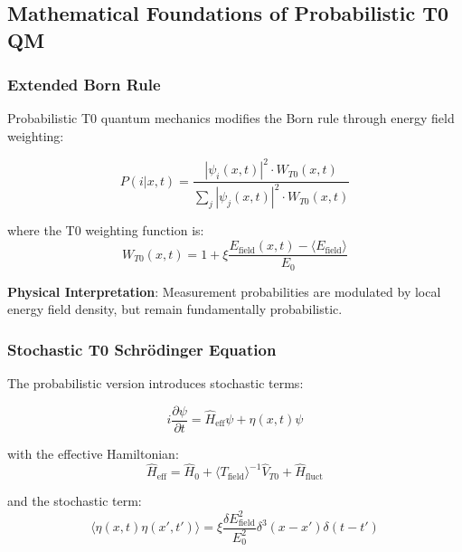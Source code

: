 \documentclass[12pt,a4paper]{article}
\newcommand{\xipar}{\xi}
\theoremstyle{definition}
\theoremstyle{remark}
\begin{document}
\subsection{Mathematical Foundations of Probabilistic T0 QM}

\subsubsection{Extended Born Rule}

Probabilistic T0 quantum mechanics modifies the Born rule through energy field weighting:

\begin{equation}
	\boxed{P(i|x,t) = \frac{|\psi_i(x,t)|^2 \cdot W_{T0}(x,t)}{\sum_j |\psi_j(x,t)|^2 \cdot W_{T0}(x,t)}}
	\label{eq:modified_born_rule_en}
\end{equation}

where the T0 weighting function is:
\begin{equation}
	W_{T0}(x,t) = 1 + \xipar \frac{E_{\text{field}}(x,t) - \langle E_{\text{field}} \rangle}{E_0}
	\label{eq:t0_weighting_en}
\end{equation}

\textbf{Physical Interpretation}: Measurement probabilities are modulated by local energy field density, but remain fundamentally probabilistic.

\subsubsection{Stochastic T0 Schrödinger Equation}

The probabilistic version introduces stochastic terms:

\begin{equation}
	\boxed{i\frac{\partial\psi}{\partial t} = \hat{H}_{\text{eff}} \psi + \eta(x,t) \psi}
	\label{eq:stochastic_schrodinger_en}
\end{equation}

with the effective Hamiltonian:
\begin{equation}
	\hat{H}_{\text{eff}} = \hat{H}_0 + \langle T_{\text{field}} \rangle^{-1} \hat{V}_{T0} + \hat{H}_{\text{fluct}}
	\label{eq:effective_hamiltonian_en}
\end{equation}

and the stochastic term:
\begin{equation}
	\langle \eta(x,t) \eta(x',t') \rangle = \xipar \frac{\delta E_{\text{field}}^2}{E_0^2} \delta^3(x-x') \delta(t-t')
	\label{eq:stochastic_correlations_en}
\end{equation}
\end{document}
